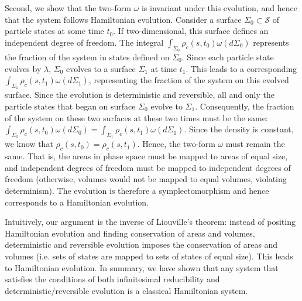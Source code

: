 \documentclass[12pt, twoside]{article}
\begin{document}
Second, we show that the two-form $\omega$ is invariant under this evolution, and hence that the system follows Hamiltonian evolution. Consider a surface $\Sigma_0 \subset \mathcal{S}$ of particle states at some time $t_0$. If two-dimensional, this surface defines an independent degree of freedom. The integral $\int_{\Sigma_0} \rho_c (s, t_0) \omega(d\Sigma_0)$ represents the fraction of the system in states defined on $\Sigma_0$. Since each particle state evolves by $\lambda$, $\Sigma_0$ evolves to a surface $\Sigma_1$ at time $t_1$. This leads to a corresponding $\int_{\Sigma_1} \rho_c (s, t_1) \omega(d\Sigma_1)$, representing the fraction of the system on this evolved surface. Since the evolution is deterministic and reversible, all and only the particle states that began on surface  $\Sigma_0$ evolve to $\Sigma_1$. Consequently, the fraction of the system on these two surfaces at these two times must be the same: $\int_{\Sigma_0} \rho_c (s, t_0) \omega(d\Sigma_0) = \int_{\Sigma_1} \rho_c (s, t_1) \omega(d\Sigma_1)$. Since the density is constant, we know that $\rho_c (s, t_0) = \rho_c (s, t_1)$. Hence, the two-form $\omega$ must remain the same. That is, the areas in phase space must be mapped to areas of equal size, and independent degrees of freedom must be mapped to independent degrees of freedom (otherwise, volumes would not be mapped to equal volumes, violating determinism). The evolution is therefore a symplectomorphism and hence corresponds to a Hamiltonian evolution. 

Intuitively, our argument is the inverse of Liouville's theorem: instead of positing Hamiltonian evolution and finding conservation of areas and volumes, deterministic and reversible evolution imposes the conservation of areas and volumes (i.e. sets of states are mapped to sets of states of equal size). This leads to Hamiltonian evolution. In summary, we have shown that any system that satisfies the conditions of both infinitesimal reducibility and deterministic/reversible evolution is a classical Hamiltonian system.
\end{document}
